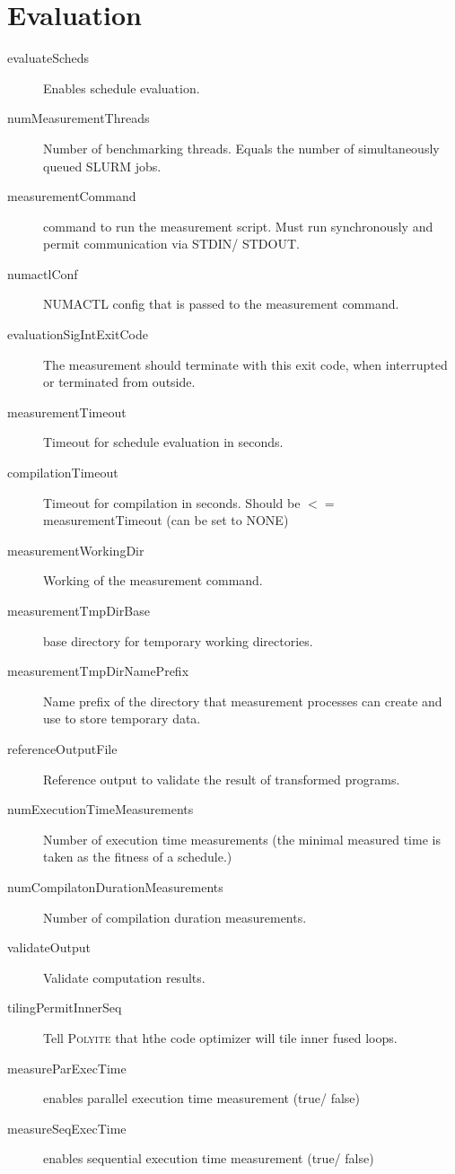 \documentclass{article}
\begin{document}
    \section{Evaluation}
    \begin{description}
      \item[evaluateScheds] Enables schedule evaluation.
      \item[numMeasurementThreads] Number of benchmarking threads. Equals the
        number of simultaneously queued \textsc{SLURM} jobs.
      \item[measurementCommand] command to run the measurement script. Must run
        synchronously and permit communication via STDIN/ STDOUT.
      \item[numactlConf] \textsc{NUMACTL} config that is passed to the measurement command.
      \item[evaluationSigIntExitCode] The measurement should terminate with this
      exit code, when interrupted or terminated from outside.
      \item[measurementTimeout] Timeout for schedule evaluation in seconds.
      \item[compilationTimeout] Timeout for compilation in seconds. Should be $<=$ measurementTimeout (can be set to NONE)
      \item[measurementWorkingDir] Working of the measurement command.
      \item[measurementTmpDirBase] base directory for temporary working directories.
      \item[measurementTmpDirNamePrefix] Name prefix of the directory that measurement processes
      can create and use to store temporary data.
      \item[referenceOutputFile] Reference output to validate the result of transformed
        programs.
      \item[numExecutionTimeMeasurements] Number of execution time measurements (the minimal measured time
        is taken as the fitness of a schedule.)
      \item[numCompilatonDurationMeasurements] Number of compilation duration measurements.
      \item[validateOutput] Validate computation results.
      \item[tilingPermitInnerSeq] Tell \textsc{Polyite} that hthe code optimizer will tile inner fused loops.
      \item[measureParExecTime] enables parallel execution time measurement (true/ false)
      \item[measureSeqExecTime] enables sequential execution time measurement (true/ false)

\end{description}
\end{document}

